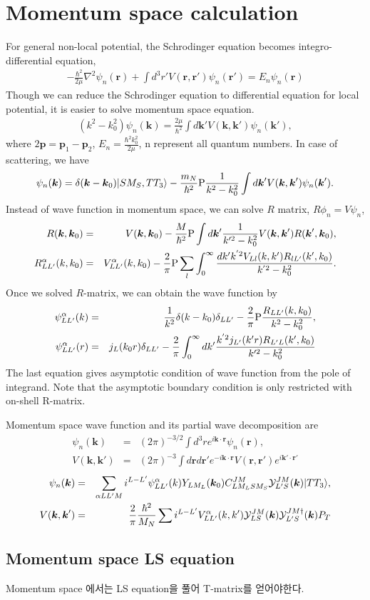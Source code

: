 \documentclass[10pt]{book}
\def\bm{\boldsymbol}
\newcommand{\bea}{\begin{eqnarray}}
\newcommand{\eea}{\end{eqnarray}}
\newcommand{\no}{\nonumber \\}
\def\vp{{\bm p}}
\def\vk{{\bm k}}
\def\vr{{\bm r}}
\def\ra{\rangle}
\begin{document}
\section{Momentum space calculation}
For general non-local potential, the Schrodinger equation becomes
integro-differential equation,
\bea
-\frac{\hbar^2}{2\mu}\nabla^2 \psi_n(\vr)
+\int d^3 r' V(\vr,\vr')\psi_n(\vr')
=E_n\psi_n(\vr) 
\eea
Though we can reduce the Schrodinger equation to
differential equation for local potential,
it is easier to solve momentum space equation.
\bea
(k^2-k_0^2)\psi_n(\vk)
=\frac{2\mu}{\hbar^2}\int d\vk' V(\vk,\vk')\psi_n(\vk'),
\eea 
where $2\vp=\vp_1-\vp_2$, $E_n=\frac{\hbar^2 k_0^2}{2\mu}$,
n represent all quantum numbers.
In case of scattering, we have
\bea
\psi_n(\vk)=\delta(\vk-\vk_0)|SM_S,TT_3\ra
            -\frac{m_N}{\hbar^2}{\rm P}
            \frac{1}{k^2-k_0^2}
            \int d\vk' V(\vk,\vk')\psi_n(\vk'). 
\eea
Instead of wave function in momentum space, we can solve $R$ matrix,
$R\phi_n=V\psi_n$,
\bea
R(\vk,\vk_0)&=&V(\vk,\vk_0)-\frac{M}{\hbar^2}{\rm P}
        \int d\vk' \frac{1}{k'^2-k_0^2}
        V(\vk,\vk')R(\vk',\vk_0) ,\no
R_{LL'}^\alpha(k,k_0)
&=& V_{LL' }^\alpha(k,k_0)-\frac{2}{\pi}{\rm P}\sum_l
    \int_0^\infty \frac{dk' k^{'2} V_{L l}(k,k')R_{lL'}(k',k_0)}
    {k^{'2}-k_0^2}.       
\eea
Once we solved $R$-matrix, we can obtain the wave function by
\bea
\psi_{LL'}^\alpha(k)
&=&\frac{1}{k^2}\delta(k-k_0)\delta_{LL'}
 -\frac{2}{\pi}{\rm P}\frac{R_{LL'}(k,k_0)}{k^2-k_0^2},\no
\psi_{LL'}^\alpha(r)
&=& j_L(k_0 r)\delta_{LL'}-\frac{2}{\pi}\int_0^\infty dk'
    \frac{k^{'2} j_{L'}(k'r) R_{L'L}(k',k_0)}
         {k'^2-k_0^2} 
\eea
The last equation gives asymptotic condition
of wave function from the pole of integrand.
Note that the asymptotic boundary condition is only 
restricted with on-shell R-matrix.


Momentum space wave function and its partial wave decomposition
are
\bea
\psi_n(\vk)&=&(2\pi)^{-3/2}\int d^3 r e^{i\vk\cdot\vr}\psi_n(\vr),\no
V(\vk,\vk')&=&(2\pi)^{-3}\int d\vr d\vr' e^{-i\vk\cdot\vr}
               V(\vr,\vr') e^{i\vk'\cdot\vr'}    
\eea
\bea
\psi_n(\vk)&=&\sum_{\alpha L L' M}
    i^{L-L'}\psi_{LL'}^\alpha(k)
    Y_{L M_L}(\vk_0) C_{L M_L S M_S}^{JM} {\cal Y}^{JM}_{L'S}(\vk)
    |T T_3\ra,\no
V(\vk,\vk')&=&\frac{2}{\pi}\frac{\hbar^2}{M_N}\sum
   i^{L-L'} V^\alpha_{LL'}(k,k')
   {\cal Y}^{JM}_{LS}(\vk){\cal Y}^{JM\dagger}_{L'S}(\vk)P_T   
\eea





\subsection{Momentum space LS equation}
Momentum space 에서는 LS equation을 풀어 T-matrix를 얻어야한다.
\end{document}
